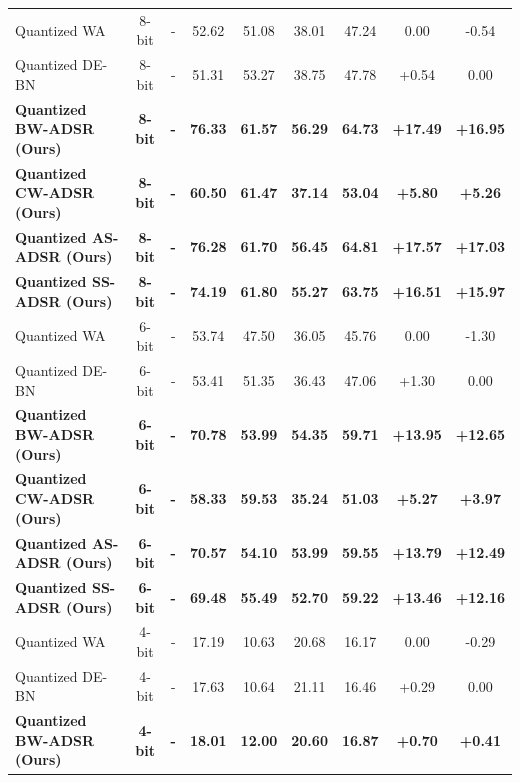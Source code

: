 \documentclass{article}
\theoremstyle{plain}
\theoremstyle{definition}
\theoremstyle{remark}
\begin{document}
\begin{table}[t]
\begin{center}
\begin{small}
\begin{sc}
\begin{tabular}{lcccccccc}
\midrule
Quantized WA & 8-bit & - & 52.62 & 51.08 & 38.01 & 47.24 & 0.00 & -0.54 \\
Quantized DE-BN & 8-bit & - & 51.31 & 53.27 & 38.75 & 47.78 & +0.54 & 0.00 \\
\textbf{Quantized BW-ADSR (Ours)} & \textbf{8-bit} & \textbf{-} & \textbf{76.33} & \textbf{61.57} & \textbf{56.29} & \textbf{64.73} & \textbf{+17.49} & \textbf{+16.95} \\
\textbf{Quantized CW-ADSR (Ours)} & \textbf{8-bit} & \textbf{-} & \textbf{60.50} & \textbf{61.47} & \textbf{37.14} & \textbf{53.04} & \textbf{+5.80} & \textbf{+5.26} \\
\textbf{Quantized AS-ADSR (Ours)} & \textbf{8-bit} & \textbf{-} & \textbf{76.28} & \textbf{61.70} & \textbf{56.45} & \textbf{64.81} & \textbf{+17.57} & \textbf{+17.03} \\
\textbf{Quantized SS-ADSR (Ours)} & \textbf{8-bit} & \textbf{-} & \textbf{74.19} & \textbf{61.80} & \textbf{55.27} & \textbf{63.75} & \textbf{+16.51} & \textbf{+15.97} \\
\midrule
Quantized WA & 6-bit & - & 53.74 & 47.50 & 36.05 & 45.76 & 0.00 & -1.30 \\
Quantized DE-BN & 6-bit & - & 53.41 & 51.35 & 36.43 & 47.06 & +1.30 & 0.00 \\
\textbf{Quantized BW-ADSR (Ours)} & \textbf{6-bit} & \textbf{-} & \textbf{70.78} & \textbf{53.99} & \textbf{54.35} & \textbf{59.71} & \textbf{+13.95} & \textbf{+12.65} \\
\textbf{Quantized CW-ADSR (Ours)} & \textbf{6-bit} & \textbf{-} & \textbf{58.33} & \textbf{59.53} & \textbf{35.24} & \textbf{51.03} & \textbf{+5.27} & \textbf{+3.97} \\
\textbf{Quantized AS-ADSR (Ours)} & \textbf{6-bit} & \textbf{-} & \textbf{70.57} & \textbf{54.10} & \textbf{53.99} & \textbf{59.55} & \textbf{+13.79} & \textbf{+12.49} \\
\textbf{Quantized SS-ADSR (Ours)} & \textbf{6-bit} & \textbf{-} & \textbf{69.48} & \textbf{55.49} & \textbf{52.70} & \textbf{59.22} & \textbf{+13.46} & \textbf{+12.16} \\
\midrule
Quantized WA & 4-bit & - & 17.19 & 10.63 & 20.68 & 16.17 & 0.00 & -0.29 \\
Quantized DE-BN & 4-bit & - & 17.63 & 10.64 & 21.11 & 16.46 & +0.29 & 0.00 \\
\textbf{Quantized BW-ADSR (Ours)} & \textbf{4-bit} & \textbf{-} & \textbf{18.01} & \textbf{12.00} & \textbf{20.60} & \textbf{16.87} & \textbf{+0.70} & \textbf{+0.41} \\

\end{tabular}
\end{sc}
\end{small}
\end{center}
\end{table}
\end{document}
